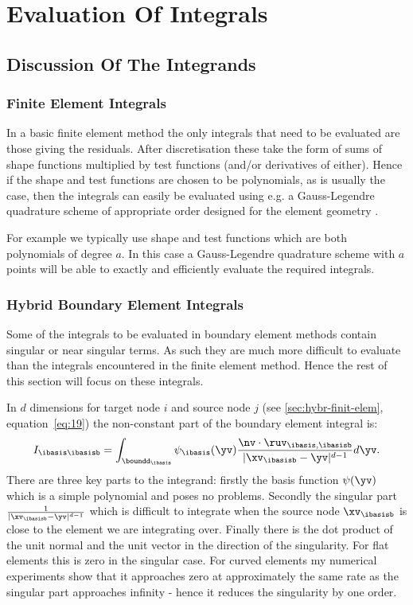 
\chapter{Evaluation Of Integrals}

\section{Discussion Of The Integrands}

\subsection{Finite Element Integrals}

In a basic finite element method the only integrals that need to be evaluated are those giving the residuals. After discretisation these take the form of sums of shape functions multiplied by test functions (and/or derivatives of either). Hence if the shape and test functions are chosen to be polynomials, as is usually the case, then the integrals can easily be evaluated using e.g. a Gauss-Legendre quadrature scheme of appropriate order designed for the element geometry \cite{??ds: Gauss-Legendre schemes for arbitrary geometry, Milan gave Mousavi2010 but it is more about polygons with large numbers of sides not 3D ones}.

For example we typically use shape and test functions which are both polynomials of degree $a$. In this case a Gauss-Legendre quadrature scheme with $a$ points  will be able to exactly and efficiently evaluate the required integrals.

\subsection{Hybrid Boundary Element Integrals}

Some of the integrals to be evaluated in boundary element methods contain singular or near singular terms. As such they are much more difficult to evaluate than the integrals encountered in the finite element method. Hence the rest of this section will focus on these integrals.

In $d$ dimensions for target node $i$ and source node $j$ (see \cref{sec:hybr-finit-elem}, equation~\cref{eq:19}) the non-constant part of the boundary element integral is:
\begin{equation}
  \label{eq:7}
   I_{\ibasis\ibasisb} = \int_{\boundd_\ibasis} \psi_\ibasis(\yv) \frac{\nv \cdot \ruv_{\ibasis,\ibasisb}}{| \xv_\ibasisb - \yv| ^{d-1}} d\yv.
\end{equation}
There are three key parts to the integrand: firstly the basis function $\psi(\yv)$ which is a simple polynomial and poses no problems. Secondly the singular part $ \frac{1}{|\xv_\ibasisb - \yv| ^{d-1}}$ which is difficult to integrate when the source node $\xv_\ibasisb$ is close to the element we are integrating over. Finally there is the dot product of the unit normal and the unit vector in the direction of the singularity. For flat elements this is zero in the singular case. For curved elements my numerical experiments show that it approaches zero at approximately the same rate as the singular part approaches infinity - hence it reduces the singularity by one order.

